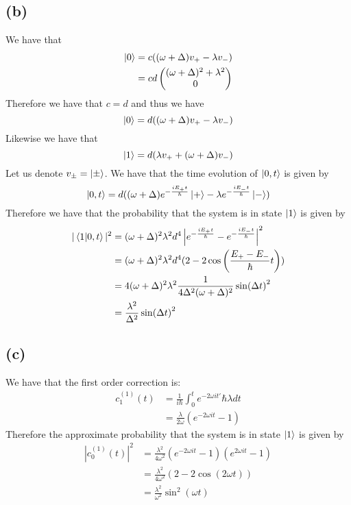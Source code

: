 \documentclass[11pt]{article}
\begin{document}
\subsection*{(b)}
We have that 
\begin{align*}
    \ket{0} &= c((\omega+\Delta)v_{+}-\lambda v_{-})\\
    &= cd \begin{pmatrix}
        (\omega+\Delta)^2+\lambda^2\\
        0
    \end{pmatrix}
\end{align*}
Therefore we have that $c=d$ and thus we have 
$$\ket{0} = d((\omega+\Delta)v_{+}-\lambda v_{-})$$
Likewise we have that 
$$\ket{1} = d(\lambda v_{+}+(\omega+\Delta)v_{-})$$
Let us denote $v_{\pm} = \ket{\pm}$. We have that the time evolution of 
$\ket{0,t}$ is given by
$$\ket{0,t} = d((\omega+\Delta)e^{-\frac{iE_{+}t}{\hbar}}\ket{+}-
\lambda e^{-\frac{iE_{-}t}{\hbar}}\ket{-})$$
Therefore we have that the probability that the 
system is in state $\ket{1}$ is given by 
\begin{align*}
    |\bra{1}\ket{0,t}|^2 &= (\omega+\Delta)^2\lambda^2 d^4\left| e^{-\frac{iE_{+}t}{\hbar}}
    -e^{-\frac{iE_{-}t}{\hbar}}\right|^2\\
    &= (\omega+\Delta)^2\lambda^2 d^4 (2-2\cos\left(\frac{E_{+}-E_{-}}{\hbar}t\right))\\
    &= 4 (\omega+\Delta)^2\lambda^2 \frac{1}{4\Delta^2(\omega+\Delta)^2} \sin(\Delta t)^2\\
    &= \frac{\lambda^2}{\Delta^2}\sin(\Delta t)^2
\end{align*}
\subsection*{(c)}
We have that the first order correction is:
\begin{align*}
    c_{1}^{(1)}(t) &= \frac{1}{i\hbar}\int_{0}^{t} e^{-2\omega i t'} \hbar\lambda dt\\
    &= \frac{\lambda}{2\omega}\left(e^{-2\omega i t}-1\right)
\end{align*}
Therefore the approximate probability that the system is in state $\ket{1}$ is given by
\begin{align*}
    |c_{0}^{(1)}(t)|^2 &= \frac{\lambda^2}{4\omega^2}\left(e^{-2\omega i t}-1\right)\left(e^{2\omega i t}-1\right)\\
    &= \frac{\lambda^2}{4\omega^2}\left(2-2\cos(2\omega t)\right)\\
    &= \frac{\lambda^2}{\omega^2}\sin^2(\omega t)
\end{align*}
\end{document}
